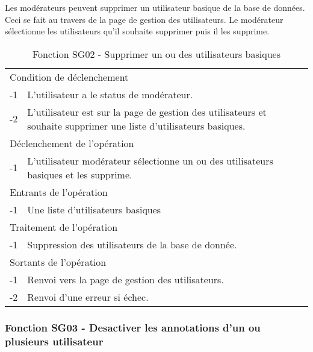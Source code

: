 \documentclass[a4paper]{article}
\begin{document}
Les modérateurs peuvent supprimer un utilisateur basique de la base de données. Ceci se fait au travers de la page de gestion des utilisateurs. Le modérateur sélectionne les utilisateurs qu'il souhaite supprimer puis il les supprime.

\begin{table}[H]
  \centering
   \small
	\begin{tabular}{|c|p{12cm}|}
   		\hline
   			\rowcolor{lightgray}\multicolumn{2}{|c|}{\textbf{Fonction SG02 - Supprimer un ou des utilisateurs}} \\
   		\hline
   			\multicolumn{2}{|l|}{Condition de déclenchement} \\
   		\hline
   			-1 & L'utilisateur a le status de modérateur.\\
        			-2 & L'utilisateur est sur la page de gestion des utilisateurs et souhaite supprimer une liste d'utilisateurs basiques.\\
        
   		\hline
   			\multicolumn{2}{|l|}{Déclenchement de l'opération} \\
   		\hline
   			-1 & L'utilisateur modérateur sélectionne un ou des utilisateurs basiques et les supprime.\\
   		\hline
   			\multicolumn{2}{|l|}{Entrants de l'opération} \\
   		\hline
   			-1 & Une liste d'utilisateurs basiques\\
   		\hline
   			\multicolumn{2}{|l|}{Traitement de l'opération} \\
  		\hline
   			-1 & Suppression des utilisateurs de la base de donnée.\\
   		\hline
   			\multicolumn{2}{|l|}{Sortants de l'opération} \\
   		\hline
   			-1 & Renvoi vers la page de gestion des utilisateurs.\\
        			-2 & Renvoi d'une erreur si échec.\\ 
   		\hline
	\end{tabular}
  \caption{Fonction SG02 - Supprimer un ou des utilisateurs basiques}
  \normalsize
  \label{tab: supprimmer_utilisateur_basique}
\end{table}


\subsubsection{Fonction SG03 - Desactiver les annotations d'un ou plusieurs utilisateur}
\end{document}
